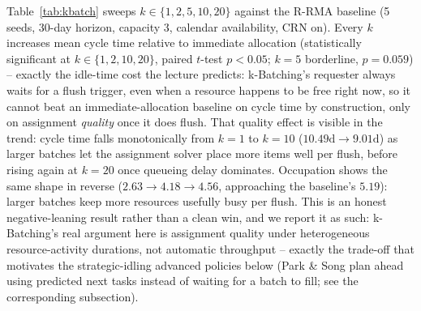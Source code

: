 \documentclass[
  english,        %
  font=times,     %
  twocolumn,      %
]{tumarticle}
\begin{document}
Table~\ref{tab:kbatch} sweeps $k \in \{1,2,5,10,20\}$ against the R-RMA
baseline (5 seeds, 30-day horizon, capacity 3, calendar availability, CRN
on). Every $k$ increases mean cycle time relative to immediate allocation
(statistically significant at $k\!\in\!\{1,2,10,20\}$, paired $t$-test
$p<0.05$; $k\!=\!5$ borderline, $p=0.059$) -- exactly the idle-time cost
the lecture predicts: k-Batching's requester always waits for a flush
trigger, even when a resource happens to be free right now, so it cannot
beat an immediate-allocation baseline on cycle time by construction, only
on assignment \emph{quality} once it does flush. That quality effect is
visible in the trend: cycle time falls monotonically from $k\!=\!1$ to
$k\!=\!10$ ($10.49\text{d} \rightarrow 9.01\text{d}$) as larger batches
let the assignment solver place more items well per flush, before rising
again at $k\!=\!20$ once queueing delay dominates. Occupation shows the
same shape in reverse ($2.63 \rightarrow 4.18 \rightarrow 4.56$,
approaching the baseline's $5.19$): larger batches keep more resources
usefully busy per flush. This is an honest negative-leaning result rather
than a clean win, and we report it as such: k-Batching's real argument
here is assignment quality under heterogeneous resource-activity
durations, not automatic throughput -- exactly the trade-off that
motivates the strategic-idling advanced policies below (Park \& Song
plan ahead using predicted next tasks instead of waiting for a batch to
fill; see the corresponding subsection).

\end{document}
